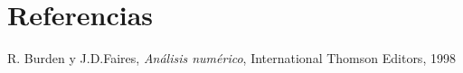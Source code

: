 \section{Referencias}

 
\begin{thebibliography}{9}


R. Burden y J.D.Faires,  \textit{Análisis numérico}, International Thomson Editors, 1998

\end{thebibliography}
